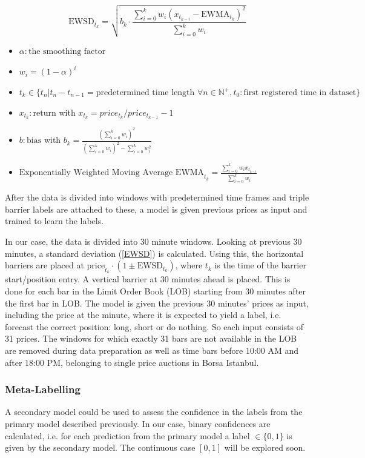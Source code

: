 \documentclass{article}
\begin{document}
\begin{equation} \label{EWSD}
    \text{EWSD}_{t_k} = \sqrt{ b_k \cdot \frac{\sum^k_{i=0} w_i (x_{t_{k-i}} - \text{EWMA}_{t_k})^2}{\sum^k_{i=0} w_i} }
\end{equation}

\begin{itemize}
    \item $\alpha: \text{the smoothing factor}$
    \item $w_i = (1 - \alpha)^i$
    \item ${t_k} \in \{ t_n |t_n - t_{n-1} = \text{predetermined time length } \forall n \in \mathbb{N}^{+},t_0: \text{first registered time in dataset} \}$
    \item $x_{t_k}: \text{return}$ with $x_{t_k} = price_{t_k}/price_{t_{k-1}} - 1$
    \item $b:\text{bias}$ with $b_k = \frac{(\sum^k_{i=0} w_i)^2}{(\sum^k_{i=0} w_i)^2 - \sum^k_{i=0} w_i^2}$
    \item $\text{Exponentially Weighted Moving Average EWMA}_{t_k} = \frac{\sum^k_{i=0} w_i x_{t_{k-i}}}{\sum^k_{i=0} w_i}$
\end{itemize}

After the data is divided into windows with predetermined time frames and triple barrier labels are attached to these, a model is given previous prices as input and trained to learn the labels. 

In our case, the data is divided into 30 minute windows. Looking at previous 30 minutes, a standard deviation (\ref{EWSD}) is calculated. Using this, the horizontal barriers are placed at $\text{price}_{t_{k}} \cdot (1 \pm \text{EWSD}_{t_{k}})$, where $t_{k}$ is the time of the barrier start/position entry. A vertical barrier at 30 minutes ahead is placed. This is done for each bar in the Limit Order Book (LOB) starting from 30 minutes after the first bar in LOB. The model is given the previous 30 minutes' prices as input, including the price at the minute, where it is expected to yield a label, i.e. forecast the correct position: long, short or do nothing. So each input consists of 31 prices. The windows for which exactly 31 bars are not available in the LOB are removed during data preparation as well as time bars before 10:00 AM and after 18:00 PM, belonging to single price auctions in Borsa Istanbul.

\subsubsection{Meta-Labelling}\label{sec::meta}
A secondary model could be used to assess the confidence in the labels from the primary model described previously. In our case, binary confidences are calculated, i.e. for each prediction from the primary model a label $\in \{0,1 \}$ is given by the secondary model. The continuous case $[0,1]$ will be explored soon. 
\end{document}
